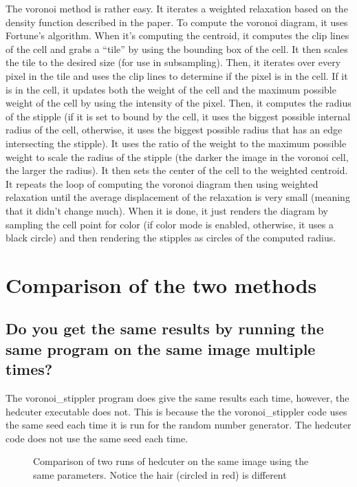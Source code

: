 \documentclass[11pt]{article}
\begin{document}
The voronoi method is rather easy. It iterates a weighted relaxation
based on the density function described in the paper. To compute the
voronoi diagram, it uses Fortune's algorithm. When it's computing the
centroid, it computes the clip lines of the cell and grabs a ``tile''
by using the bounding box of the cell. It then scales the tile to the
desired size (for use in subsampling). Then, it iterates over every
pixel in the tile and uses the clip lines to determine if the pixel is
in the cell. If it is in the cell, it updates both the weight of the
cell and the maximum possible weight of the cell by using the
intensity of the pixel. Then, it computes the radius of the stipple
(if it is set to bound by the cell, it uses the biggest possible
internal radius of the cell, otherwise, it uses the biggest possible
radius that has an edge intersecting the stipple). It uses the ratio
of the weight to the maximum possible weight to scale the radius of
the stipple (the darker the image in the voronoi cell, the larger the
radius). It then sets the center of the cell to the weighted
centroid. It repeats the loop of computing the voronoi diagram then
using weighted relaxation until the average displacement of the
relaxation is very small (meaning that it didn't change much). When it
is done, it just renders the diagram by sampling the cell point for
color (if color mode is enabled, otherwise, it uses a black circle)
and then rendering the stipples as circles of the computed radius.

\section{Comparison of the two methods}

\subsection{Do you get the same results by running the same program on the same image multiple times?}

The voronoi\_stippler program does give the same results each time,
however, the hedcuter executable does not. This is because the the
voronoi\_stippler code uses the same seed each time it is run for the
random number generator. The hedcuter code does not use the same seed
each time.

\begin{figure}[H]
  \centering
  \begin{minipage}{.5\textwidth}
    \centering
    
  \end{minipage}%
  \begin{minipage}{.5\textwidth}
    \centering
    
  \end{minipage}
  \caption{Comparison of two runs of hedcuter on the same image using
    the same parameters. Notice the hair (circled in red) is different}
\end{figure}
\end{document}
